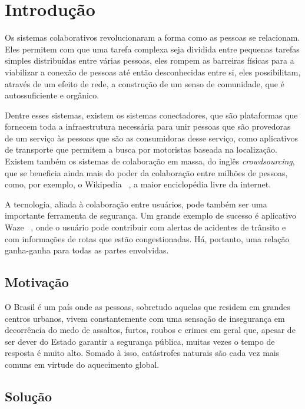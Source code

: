 \chapter{Introdução}
\label{c.introducao}

Os sistemas colaborativos revolucionaram a forma como as pessoas se relacionam. Eles permitem com que uma tarefa complexa seja dividida entre pequenas tarefas simples distribuídas entre várias pessoas, eles rompem as barreiras físicas para a viabilizar a conexão de pessoas até então desconhecidas entre si, eles possibilitam, através de um efeito de rede, a construção de um senso de comunidade, que é autossuficiente e orgânico.

Dentre esses sistemas, existem os sistemas conectadores, que são plataformas que fornecem toda a infraestrutura necessária para unir pessoas que são provedoras de um serviço às pessoas que são as consumidoras desse serviço, como aplicativos de transporte que permitem a busca por motoristas baseada na localização. Existem também os sistemas de colaboração em massa, do inglês \emph{crowdsourcing}, que se beneficia ainda mais do poder da colaboração entre milhões de pessoas, como, por exemplo, o Wikipedia ~\cite{wikipedia}, a maior enciclopédia livre da internet.

A tecnologia, aliada à colaboração entre usuários, pode também ser uma importante ferramenta de segurança. Um grande exemplo de sucesso é aplicativo Waze ~\cite{waze}, onde o usuário pode contribuir com alertas de acidentes de trânsito e com informações de rotas que estão congestionadas. Há, portanto, uma relação ganha-ganha para todas as partes envolvidas.

\section{Motivação}
\label{s.motivacao}

O Brasil é um país onde as pessoas, sobretudo aquelas que residem em grandes centros urbanos, vivem constantemente com uma sensação de insegurança em decorrência do medo de assaltos, furtos, roubos e crimes em geral que, apesar de ser dever do Estado garantir a segurança pública, muitas vezes o tempo de resposta é muito alto. Somado à isso, catástrofes naturais são cada vez mais comuns em virtude do aquecimento global.

\section{Solução}
\label{s.solucao}

